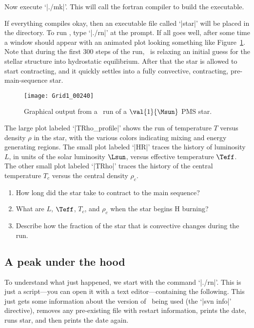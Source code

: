 Now execute `|./mk|'. This will call the fortran compiler to build the executable. 

If everything compiles okay, then an executable file called `|star|' will be placed in the directory. To run \mesa, type `|./rn|' at the prompt.  If all goes well, after some time a window should appear with an animated plot looking something like Figure~\ref{f.mesa-fig}. Note that during the first 300 steps of the run, \mesa\ is relaxing an initial guess for the stellar structure into hydrostatic equilibrium. After that the star is allowed to start contracting, and it quickly settles into a fully convective, contracting, pre-main-sequence star.

\begin{figure}[htbp]
\centering\texttt{[image: Grid1\_00240]}
\caption{Graphical output from a \mesa\ run of a $\val{1}{\Msun}$ PMS star. \label{f.mesa-fig}}
\end{figure}

The large plot labeled `|TRho_profile|' shows the run of temperature $T$ versus density $\rho$ in the star, with the various colors indicating mixing and energy generating regions. The small plot labeled `|HR|' traces the history of luminosity $L$, in units of the solar luminosity $\Lsun$, versus effective temperature $\Teff$. The other small plot labeled `|TRho|' traces the history of the central temperature $T_{c}$ versus the central density $\rho_{c}$.

\begin{exercisebox}
\begin{enumerate}
\item How long did the star take to contract to the main sequence?
\item What are $L$, $\Teff$, $T_{c}$, and $\rho_{c}$ when the star begins H burning?
\item Describe how the fraction of the star that is convective changes during the run.
\end{enumerate}
\end{exercisebox}

\subsection{A peak under the hood}
To understand what just happened, we start with the command `|./rn|'. This is just a script---you can open it with a text editor---containing the following.
This just gets some information about the version of \mesa\ being used (the `|svn info|' directive), removes any pre-existing file with restart information, prints the date, runs star, and then prints the date again.

